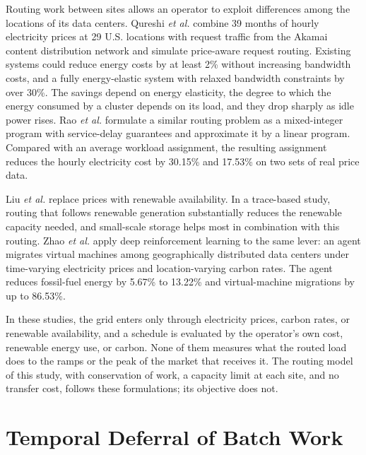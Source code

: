 \documentclass{UNCC-thesis}
\begin{document}
Routing work between sites allows an operator to exploit differences among the locations of its
data centers. Qureshi \emph{et al.} \cite{qureshi2009cutting} combine 39 months of hourly
electricity prices at 29 U.S. locations with request traffic from the Akamai content distribution
network and simulate price-aware request routing. Existing systems could reduce energy costs by at
least 2\% without increasing bandwidth costs, and a fully energy-elastic system with relaxed
bandwidth constraints by over 30\%. The savings depend on energy elasticity, the degree to which
the energy consumed by a cluster depends on its load, and they drop sharply as idle power rises.
Rao \emph{et al.} \cite{rao2010minimizing} formulate a similar routing problem as a mixed-integer
program with service-delay guarantees and approximate it by a linear program. Compared with an
average workload assignment, the resulting assignment reduces the hourly electricity cost by
30.15\% and 17.53\% on two sets of real price data.

Liu \emph{et al.} \cite{liu2011glb} replace prices with renewable availability. In a trace-based
study, routing that follows renewable generation substantially reduces the renewable capacity
needed, and small-scale storage helps most in combination with this routing.
Zhao \emph{et al.} \cite{zhao2025cfws} apply deep reinforcement learning to the same
lever: an agent migrates virtual machines among geographically distributed data centers under
time-varying electricity prices and location-varying carbon rates. The agent reduces fossil-fuel energy
by 5.67\% to 13.22\% and virtual-machine migrations by up to 86.53\%.

In these studies, the grid enters only through electricity prices, carbon rates, or renewable
availability, and a schedule is evaluated by the operator's own cost, renewable energy use, or
carbon. None of them measures what the routed load does to the ramps or the peak of the market
that receives it. The routing model of this study, with conservation of work, a capacity limit at
each site, and no transfer cost, follows these formulations; its objective does not.

\section{Temporal Deferral of Batch Work}
\label{sec:lit-deferral}
\end{document}
